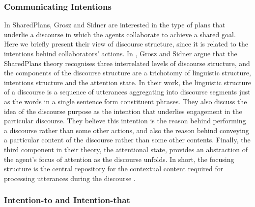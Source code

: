 \documentclass[12pt]{report}
\begin{document}
\subsubsection{Communicating Intentions}
In SharedPlans, Grosz and Sidner are interested in the type of plans that
underlie a discourse in which the agents collaborate to achieve a shared goal.
Here we briefly present their view of discourse structure, since it is related
to the intentions behind collaborators' actions. In
\cite{grosz:plans-discourse}, Grosz and Sidner argue that the SharedPlans theory
recognises three interrelated levels of discourse structure, and the components
of the discourse structure are a trichotomy of linguistic structure, intentions
structure and the attention state. In their work, the linguistic structure of a
discourse is a sequence of utterances aggregating into discourse segments just
as the words in a single sentence form constituent phrases. They also discuss
the idea of the discourse purpose as the intention that underlies engagement in
the particular discourse. They believe this intention is the reason behind
performing a discourse rather than some other actions, and also the reason
behind conveying a particular content of the discourse rather than some other
contents.
Finally, the third component in their theory, the attentional state, provides an
abstraction of the agent's focus of attention as the discourse unfolds. 
In short, the focusing structure is the central repository for the contextual
content required for processing utterances during the discourse
\cite{grosz:plans-discourse}. 

\vspace*{-5mm}
\subsubsection{Intention-to and Intention-that}
\label{sec:intend-to-that}
\vspace*{-3mm}
\end{document}
